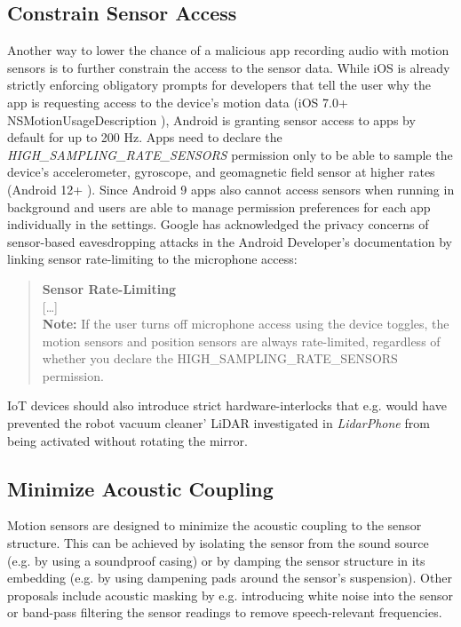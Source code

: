\documentclass[sigconf, nonacm]{acmart}
\begin{document}
\subsection{Constrain Sensor Access}
Another way to lower the chance of a malicious app recording audio with motion sensors is to further constrain the access to the sensor data.
While iOS is already strictly enforcing obligatory prompts for developers that tell the user why the app is requesting access to the device's motion data (iOS 7.0+ NSMotionUsageDescription \cite{AppleDeveloperMotionUsageDescription}), Android is granting sensor access to apps by default for up to 200 Hz. Apps need to declare the \textit{HIGH\_SAMPLING\_RATE\_SENSORS} permission only to be able to sample the device's accelerometer, gyroscope, and geomagnetic field sensor at higher rates (Android 12+ \cite{AndroidDeveloperSensorDocs}).
Since Android 9 apps also cannot access sensors when running in background and users are able to manage permission preferences for each app individually in the settings.
Google has acknowledged the privacy concerns of sensor-based eavesdropping attacks in the Android Developer's documentation \cite{AndroidDeveloperSensorDocs} by linking sensor rate-limiting to the microphone access:
\begin{quote}
  \vspace{0.1cm}
  \textbf{Sensor Rate-Limiting} \\
  {[\ldots]} \\
  \textbf{Note:} If the user turns off microphone access using the device toggles, the motion sensors and position sensors are always rate-limited, regardless of whether you declare the HIGH\_SAMPLING\_RATE\_SENSORS permission.
\end{quote}

\noindent
IoT devices should also introduce strict hardware-interlocks that e.g. would have prevented the robot vacuum cleaner' LiDAR investigated in \textit{LidarPhone} \cite{LidarPhone2020} from being activated without rotating the mirror.

\subsection{Minimize Acoustic Coupling}
Motion sensors are designed to minimize the acoustic coupling to the sensor structure.
This can be achieved by isolating the sensor from the sound source (e.g. by using a soundproof casing) or by damping the sensor structure in its embedding (e.g. by using dampening pads around the sensor's suspension).
Other proposals include acoustic masking by e.g. introducing white noise into the sensor or band-pass filtering the sensor readings to remove speech-relevant frequencies.
\end{document}

